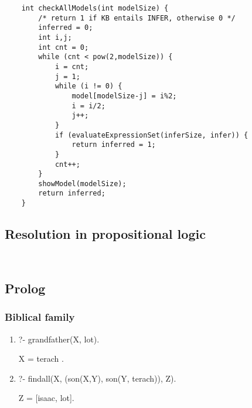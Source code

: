 \documentclass{article}
\begin{document}
	\begin{lstlisting}
	int checkAllModels(int modelSize) {
		/* return 1 if KB entails INFER, otherwise 0 */
		inferred = 0;
		int i,j;
		int cnt = 0;
		while (cnt < pow(2,modelSize)) {
			i = cnt;
			j = 1;
			while (i != 0) {
				model[modelSize-j] = i%2;
				i = i/2;
				j++;
			}
			if (evaluateExpressionSet(inferSize, infer)) {
				return inferred = 1;
			}
			cnt++;
		}
		showModel(modelSize);
		return inferred;
	}
	\end{lstlisting}
	
	
	\subsection*{Resolution in propositional logic}
	\begin{lstlisting}
	
	\end{lstlisting}
	
	\subsection*{Prolog}
	
	\subsubsection*{Biblical family}
	\begin{enumerate}
	\item ?- grandfather(X, lot).
	
	X = terach .

	\item ?- findall(X, (son(X,Y), son(Y, terach)), Z).
	
	Z = [isaac, lot].

	\end{enumerate}
\end{document}
